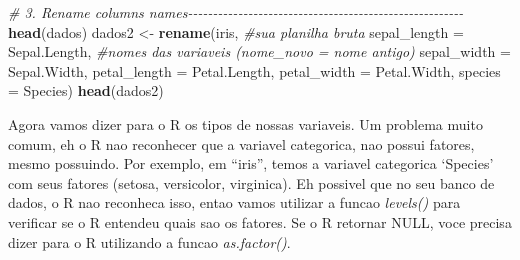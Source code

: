 \documentclass[
]{book}
\newenvironment{Shaded}{\begin{snugshade}}{\end{snugshade}}
\newcommand{\AttributeTok}[1]{\textcolor[rgb]{0.13,0.29,0.53}{#1}}
\newcommand{\CommentTok}[1]{\textcolor[rgb]{0.56,0.35,0.01}{\textit{#1}}}
\newcommand{\FunctionTok}[1]{\textcolor[rgb]{0.13,0.29,0.53}{\textbf{#1}}}
\newcommand{\NormalTok}[1]{#1}
\newcommand{\OtherTok}[1]{\textcolor[rgb]{0.56,0.35,0.01}{#1}}
\newcommand{\SpecialCharTok}[1]{\textcolor[rgb]{0.81,0.36,0.00}{\textbf{#1}}}
\begin{document}
\begin{Shaded}
\begin{Highlighting}[]

\CommentTok{\# 3. Rename columns names{-}{-}{-}{-}{-}{-}{-}{-}{-}{-}{-}{-}{-}{-}{-}{-}{-}{-}{-}{-}{-}{-}{-}{-}{-}{-}{-}{-}{-}{-}{-}{-}{-}{-}{-}{-}{-}{-}{-}{-}{-}{-}{-}{-}{-}{-}{-}{-}{-}{-}{-}{-}{-}{-}{-}}
\FunctionTok{head}\NormalTok{(dados)}
\NormalTok{dados2 }\OtherTok{\textless{}{-}} \FunctionTok{rename}\NormalTok{(iris,                         }\CommentTok{\#sua planilha bruta}
                 \AttributeTok{sepal\_length =}\NormalTok{ Sepal.Length,  }\CommentTok{\#nomes das variaveis (nome\_novo = nome antigo)}
                 \AttributeTok{sepal\_width  =}\NormalTok{ Sepal.Width,}
                 \AttributeTok{petal\_length =}\NormalTok{ Petal.Length,}
                 \AttributeTok{petal\_width  =}\NormalTok{ Petal.Width,}
                 \AttributeTok{species      =}\NormalTok{ Species)}
\FunctionTok{head}\NormalTok{(dados2)}
\end{Highlighting}
\end{Shaded}

Agora vamos dizer para o R os tipos de nossas variaveis. Um problema muito comum, eh o R nao reconhecer que a variavel categorica, nao possui fatores, mesmo possuindo. Por exemplo, em ``iris'', temos a variavel categorica `Species' com seus fatores (setosa, versicolor, virginica). Eh possivel que no seu banco de dados, o R nao reconheca isso, entao vamos utilizar a funcao \emph{levels()} para verificar se o R entendeu quais sao os fatores. Se o R retornar NULL, voce precisa dizer para o R utilizando a funcao \emph{as.factor()}.

\begin{Shaded}
\end{Shaded}
\end{document}
